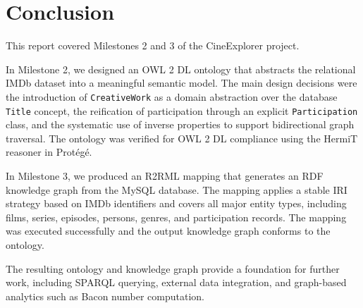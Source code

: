 \section{Conclusion}

This report covered Milestones 2 and 3 of the CineExplorer project.

In Milestone 2, we designed an OWL 2 DL ontology that abstracts the relational IMDb dataset into a meaningful semantic model. The main design decisions were the introduction of \texttt{CreativeWork} as a domain abstraction over the database \texttt{Title} concept, the reification of participation through an explicit \texttt{Participation} class, and the systematic use of inverse properties to support bidirectional graph traversal. The ontology was verified for OWL 2 DL compliance using the HermiT reasoner in Protégé.

In Milestone 3, we produced an R2RML mapping that generates an RDF knowledge graph from the MySQL database. The mapping applies a stable IRI strategy based on IMDb identifiers and covers all major entity types, including films, series, episodes, persons, genres, and participation records. The mapping was executed successfully and the output knowledge graph conforms to the ontology.

The resulting ontology and knowledge graph provide a foundation for further work, including SPARQL querying, external data integration, and graph-based analytics such as Bacon number computation.